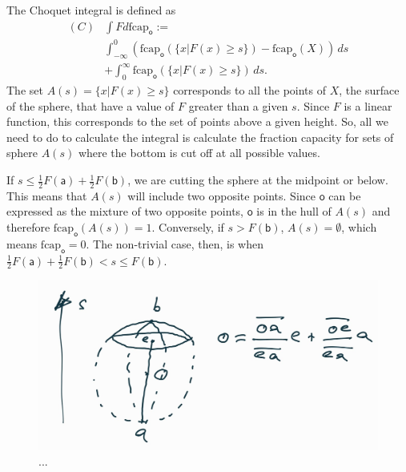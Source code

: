 \documentclass[10pt,twocolumn, nofootinbib]{revtex4-2}
\newcommand\frcap{\mathrm{fcap}}
\newcommand{\ens}[1][e] {\mathsf{#1}} %
\begin{document}
The Choquet integral is defined as 
\begin{equation}
	\begin{aligned}
(C)&\int F d\frcap_{\ens[o]} := \\
&\int_{-\infty}^0
(\frcap_{\ens[o]} (\{x | F (x) \geq s\})-\frcap_{\ens[o]}(X))\, ds \\
&+
\int^\infty_0
\frcap_{\ens[o]} (\{x | F (x) \geq s\})\, ds.
	\end{aligned}
\end{equation}
The set $A(s) = \{x | F (x) \geq s\}$ corresponds to all the points of $X$, the surface of the sphere, that have a value of $F$ greater than a given $s$. Since $F$ is a linear function, this corresponds to the set of points above a given height. So, all we need to do to calculate the integral is calculate the fraction capacity for sets of sphere $A(s)$ where the bottom is cut off at all possible values.

If $s\leq \frac{1}{2} F(\ens[a]) + \frac{1}{2} F(\ens[b])$, we are cutting the sphere at the midpoint or below. This means that $A(s)$ will include two opposite points. Since $\ens[o]$ can be expressed as the mixture of two opposite points, $\ens[o]$ is in the hull of $A(s)$ and therefore $\frcap_{\ens[o]}(A(s)) = 1$. Conversely, if $s > F(\ens[b])$, $A(s) = \emptyset$, which means $\frcap_{\ens[o]} = 0$. The non-trivial case, then, is when $\frac{1}{2} F(\ens[a]) + \frac{1}{2} F(\ens[b]) < s \leq F(\ens[b])$.

\begin{figure}[H]
	\centering
	\includegraphics[width=0.8\columnwidth]{ChoquetCalculation2.jpg}
	\caption{...}
\end{figure}
\end{document}
